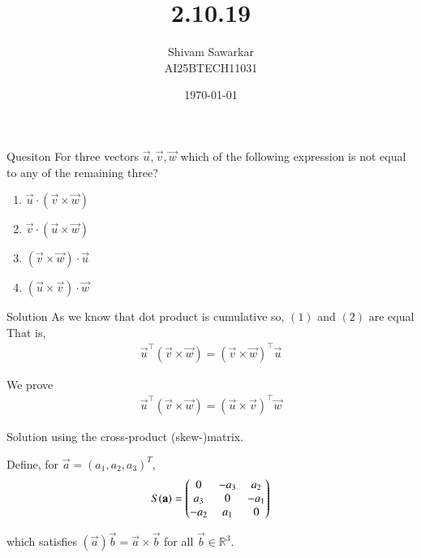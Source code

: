 \documentclass{beamer}
\title %
{2.10.19}
\date{\today}
\author %
{Shivam Sawarkar \\ AI25BTECH11031}
\begin{document}
\frame{\titlepage}

\begin{frame}{Quesiton}
     For three vectors $\Vec{u},\Vec{v},\vec{w}$ which of the following expression is not equal to any of the
 remaining three?
 \begin{enumerate}[a]
     \item $\vec{u}\cdot(\vec{v}\times\vec{w})$
     \item $\vec{v}\cdot(\vec{u}\times\vec{w})$
     \item $(\vec{v}\times\vec{w})\cdot\vec{u}$
     \item $(\vec{u}\times\vec{v})\cdot\vec{w}$
 \end{enumerate}
\end{frame}

\begin{frame}{Solution}
    As we know that dot product is cumulative so, $(1)$ and $(2)$ are equal \\
 That is,
\begin{align}
     \vec{u}^\top(\vec{v}\times\vec{w}) = (\vec{v}\times\vec{w})^\top\vec{u}
\end{align}

We prove
\begin{align}
\vec{u}^\top(\vec{v}\times\vec{w})=(\vec{u}\times\vec{v})^\top\vec{w}
\end{align}
\end{frame}

\begin{frame}{Solution}
    using the cross-product (skew-)matrix.

Define, for \(\vec{a}=(a_1,a_2,a_3)^T\),
\begin{align}
S(\mathbf{a})=\begin{pmatrix}
0 & -a_3 & a_2\\
a_3 & 0 & -a_1\\
-a_2 & a_1 & 0
\end{pmatrix}
\end{align}

which satisfies $(\vec{a})\vec{b}=\vec{a}\times\vec{b}$  for all $\vec{b}\in\mathbb{R}^3$.
\end{frame}
\end{document}

